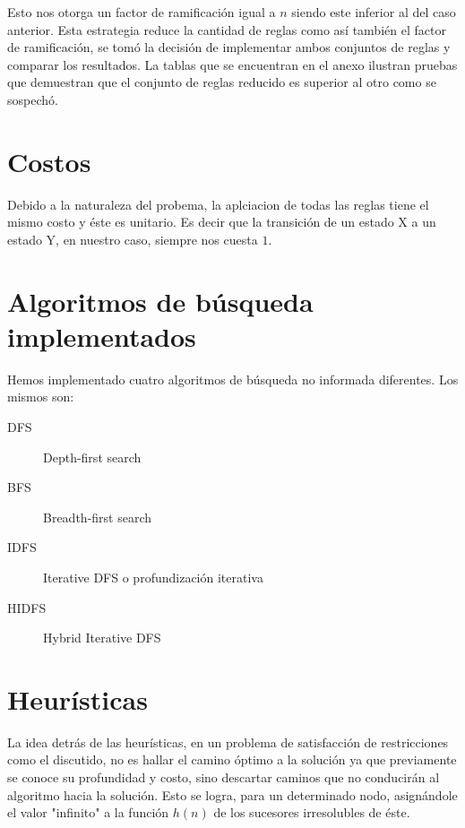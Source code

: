 \documentclass[%
	final,
	reprint,
	notitlepage,
	narroweqnarray,
	inline,
	twoside,
	invited
	]{ieee}
\begin{document}
\par Esto nos otorga un factor de ramificación igual a $n$ siendo este inferior al del caso anterior. Esta estrategia reduce la cantidad de reglas como así también el factor de ramificación, se tomó la decisión de implementar ambos conjuntos de reglas y comparar los resultados.
La tablas que se encuentran en el anexo ilustran pruebas que demuestran que el conjunto de reglas reducido es superior al otro como se sospechó.

\section{Costos}

\par Debido a la naturaleza del probema, la aplciacion de todas las reglas tiene el mismo costo y éste es unitario. Es decir que la transición de un estado X a un estado Y, en nuestro caso, siempre nos cuesta $1$.

\section{Algoritmos de búsqueda implementados}

\par Hemos implementado cuatro algoritmos de búsqueda no informada diferentes. Los mismos son:

\begin{description}

\item[DFS]
Depth-first search

\item[BFS]
Breadth-first search

\item[IDFS]
Iterative DFS o profundización iterativa

\item[HIDFS]
Hybrid Iterative DFS

\end{description}

\section{Heurísticas}

\par La idea detrás de las heurísticas, en un  problema de satisfacción de restricciones como el discutido, no es hallar el camino óptimo a la solución ya que previamente se conoce su profundidad y  costo,  sino descartar caminos que no conducirán al algoritmo hacia la solución. Esto se logra, para un determinado nodo, asignándole el valor "infinito" a la función $h(n)$ de los sucesores irresolubles de éste.\\
\end{document}
